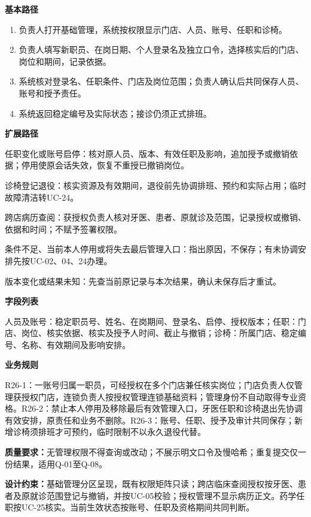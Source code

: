 \documentclass[UTF8,a4paper,zihao=-4,fontset=none]{ctexart}
\begin{document}
\smallskip\noindent\textbf{基本路径}\par
\begin{enumerate}\setlength{\itemsep}{0pt}\setlength{\parsep}{0pt}\setlength{\topsep}{2pt}
\item 负责人打开基础管理，系统按权限显示门店、人员、账号、任职和诊椅。
\item 负责人填写新职员、在岗日期、个人登录名及独立口令，选择核实后的门店、岗位和期间，记录依据。
\item 系统核对登录名、任职条件、门店及岗位范围；负责人确认后共同保存人员、账号和授予责任。
\item 系统返回稳定编号及实际状态；接诊仍须正式排班。
\end{enumerate}
\noindent\textbf{扩展路径}\par
\begin{description}\setlength{\itemsep}{0pt}\setlength{\parsep}{0pt}\setlength{\topsep}{2pt}
\item[1a] 任职变化或账号启停：核对原人员、版本、有效任职及影响，追加授予或撤销依据；停用使原会话失效，恢复不重授已撤销岗位。
\item[1b] 诊椅登记退役：核实资源及有效期间，退役前先协调排班、预约和实际占用；临时故障清洁转UC-24。
\item[1c] 跨店病历查阅：获授权负责人核对牙医、患者、原就诊及范围，记录授权或撤销、依据和时间；不赋予签署权限。
\item[3a] 条件不足、当前本人停用或将失去最后管理入口：指出原因，不保存；有未协调安排先按UC-02、04、24办理。
\item[3b] 版本变化或结果未知：先查当前原记录与本次结果，确认未保存后才重试。
\end{description}
\noindent\textbf{字段列表}\par
人员及账号：稳定职员号、姓名、在岗期间、登录名、启停、授权版本；任职：门店、岗位、核实依据、核实及授予人时间、截止与撤销；诊椅：所属门店、稳定编号、名称、有效期间及影响安排。\par
\noindent\textbf{业务规则}\par
R26-1：一账号归属一职员，可经授权在多个门店兼任核实岗位；门店负责人仅管理获授权门店，连锁负责人按授权管理连锁基础资料；管理身份不自动取得专业资格。R26-2：禁止本人停用及移除最后有效管理入口，牙医任职和诊椅退出先协调有效安排，原责任和业务不删除。R26-3：账号、任职、授予及审计共同保存；新增诊椅须排班才可预约，临时限制不以永久退役代替。\par
\noindent\textbf{质量要求：}无管理权限不得查询或改动；不展示明文口令及慢哈希；重复提交仅一份结果，适用Q-01至Q-08。\par
\noindent\textbf{设计约束：}基础管理分区呈现，既有权限矩阵只读；跨店临床查阅授权按牙医、患者及原就诊范围登记与撤销，并按UC-05校验；授权管理不显示病历正文。药学任职按UC-25核实。当前生效状态按账号、任职及资格期间共同判断。\par
\endgroup
\clearpage
\end{document}
